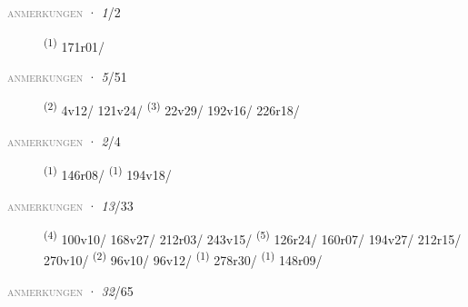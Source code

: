 \textsc{\textcolor{gray}{anmerkungen}}
\ENTRYEND
\noindent{} · \textit{1}/2 \LEMMALINE
\begin{description}
    \item[]  \textsuperscript{(1)} \mbox{171r01/}
\end{description}
\textsc{\textcolor{gray}{anmerkungen}}
\ENTRYEND
\noindent{} · \textit{5}/51 \LEMMALINE
\begin{description}
    \item[]  \textsuperscript{(2)} \mbox{4v12/} \mbox{121v24/} \CASEBREAK {} \textsuperscript{(3)} \mbox{22v29/} \mbox{192v16/} \mbox{226r18/}
\end{description}
\textsc{\textcolor{gray}{anmerkungen}}
\ENTRYEND
\noindent{} · \textit{2}/4 \LEMMALINE
\begin{description}
    \item[]  \textsuperscript{(1)} \mbox{146r08/} \CASEBREAK {} \textsuperscript{(1)} \mbox{194v18/}
\end{description}
\textsc{\textcolor{gray}{anmerkungen}}
\ENTRYEND
\noindent{} · \textit{13}/33 \LEMMALINE
\begin{description}
    \item[]  \textsuperscript{(4)} \mbox{100v10/} \mbox{168v27/} \mbox{212r03/} \mbox{243v15/} \CASEBREAK {} \textsuperscript{(5)} \mbox{126r24/} \mbox{160r07/} \mbox{194v27/} \mbox{212r15/} \mbox{270v10/} \CASEBREAK {} \textsuperscript{(2)} \mbox{96v10/} \mbox{96v12/} \textsuperscript{(1)} \mbox{278r30/} \CASEBREAK {} \textsuperscript{(1)} \mbox{148r09/}
\end{description}
\textsc{\textcolor{gray}{anmerkungen}}
\ENTRYEND
\noindent{} · \textit{32}/65 \LEMMALINE
